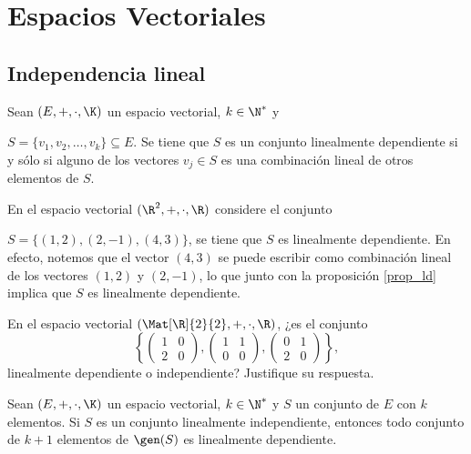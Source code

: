 \documentclass[compacto,10pt]{pubciencias-notas}
\begin{document}
\encabezado

\vspace*{-4mm}

\setcounter{section}{3}
\section{Espacios Vectoriales}
\setcounter{subsection}{5}
\subsection{Independencia lineal}

\begin{prop}\label{prop_ld}
    Sean $(E,+,\cdot,\K)$ un espacio vectorial, $k\in\N^{*}$ y
    
    \noindent $S=\{v_1,v_2,\ldots,v_k\}\subseteq E$. Se tiene que $S$ es un conjunto linealmente dependiente si y sólo si alguno de los vectores $v_j\in S$ es una combinación lineal de otros elementos de $S$.
\end{prop}

\begin{ejem}\hspace{0pt} En el espacio vectorial $(\R^{2},+,\cdot,\R)$ considere el conjunto 

\noindent $S = \{(1, 2), (2, -1), (4, 3)\}$, se tiene que $S$ es linealmente dependiente. En efecto, notemos que el vector $(4, 3)$ se puede escribir como combinación lineal de los vectores $(1, 2)$ y  $(2, -1)$, lo que junto con la proposición \ref{prop_ld} implica que $S$ es linealmente dependiente.
\end{ejem}

\begin{ejer}\hspace{0pt} En el espacio vectorial $(\Mat[\R]{2}{2}, +, \cdot, \R)$, 
¿es el conjunto \[\left\{\begin{pmatrix} 1 & 0\\ 2 & 0 \end{pmatrix}, \begin{pmatrix} 1 & 1\\ 0 & 0 \end{pmatrix}, \begin{pmatrix} 0 & 1\\ 2 & 0 \end{pmatrix} \right\},\] linealmente dependiente o independiente? Justifique su respuesta.
\end{ejer}

\begin{prop}
Sean $(E, +, \cdot, \K)$ un espacio vectorial, $k\in\N^{*}$ y $S$ un conjunto de $E$ con $k$ elementos. Si $S$ es un conjunto linealmente independiente, entonces todo conjunto de $k + 1$ elementos de $\gen(S)$ es linealmente dependiente.
\end{prop}
\end{document}
